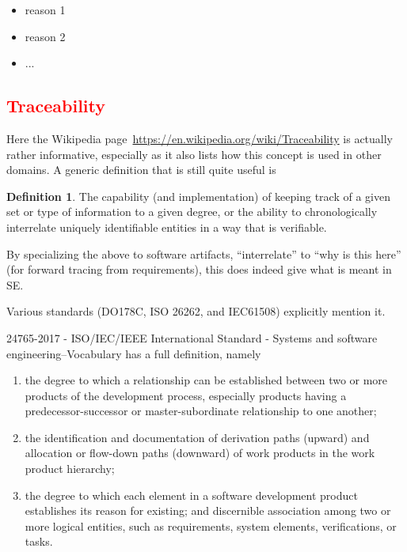 \documentclass[letterpaper, cleveref]{lipics-v2019}
\newcommand{\authornote}[3]{\textcolor{#1}{[#3 ---#2]}}
\newcommand{\authornote}[3]{}
\newcommand{\jc}[1]{\authornote{red}{JC}{#1}} %
\newcommand{\notdone}[1]{\textcolor{red}{#1}}
\theoremstyle{definition}
\newtheorem{defn}{Definition}
\begin{document}
\begin{itemize}
  \item reason 1
  \item reason 2
  \item ...
\end{itemize}


\subsection{\notdone{Traceability}} %

Here the Wikipedia page~\url{https://en.wikipedia.org/wiki/Traceability} is
actually rather informative, especially as it also lists how this concept is
used in other domains.  A generic definition that is still quite useful is

\begin{defn}
  The capability (and implementation) of keeping track of a given set or
  type of information to a given degree, or the ability to chronologically
  interrelate uniquely identifiable entities in a way that is verifiable.
\end{defn}

By specializing the above to software artifacts, ``interrelate'' to ``why is
this here'' (for forward tracing from requirements), this does indeed give
what is meant in SE.

Various standards (DO178C, ISO 26262, and IEC61508) explicitly mention it.

24765-2017 - ISO/IEC/IEEE International Standard - Systems and software
engineering--Vocabulary has a full definition, namely
\begin{enumerate}
\item the degree to which a relationship can be established between two or more
  products of the development process, especially products having a
  predecessor-successor or master-subordinate relationship to one another;
\item the identification and documentation of derivation paths (upward) and
  allocation or flow-down paths (downward) of work products in the work product
  hierarchy;
\item the degree to which each element in a software development product
  establishes its reason for existing; and discernible association among two or
  more logical entities, such as requirements, system elements, verifications,
  or tasks.
\end{enumerate}
\end{document}
